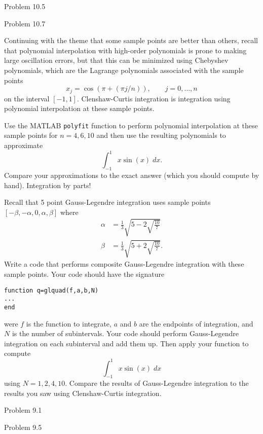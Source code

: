 \documentclass[minion]{homework}
\begin{document}
\begin{aproblems}
\vskip 0.5cm

\aproblem Problem 10.5

\aproblem Problem 10.7

\aproblem Continuing with the theme that some sample points are better than others, recall that polynomial interpolation with high-order polynomials is prone to making large oscillation errors, but that this can be minimized
using Chebyshev polynomials, which are the Lagrange polynomials associated
with the sample points 
\[
x_j= \cos(\pi+(\pi j/n)),\qquad j=0,\ldots,n
\]
on the interval $[-1,1]$.
Clenshaw-Curtis integration is integration using polynomial interpolation at
these sample points.

Use the MATLAB \texttt{polyfit} function to perform polynomial
interpolation at these sample points for $n=4,6,10$ and then
use the resulting polynomials to approximate
\[
\int_{-1}^1 x\sin(x)\;dx.
\]
Compare your approximations to the exact answer (which you should
compute by hand).  Integration by parts!

\aproblem Recall that 5 point Gauss-Legendre integration
uses sample points
$[-\beta,-\alpha,0,\alpha,\beta]$ where
\[
\begin{aligned}
\alpha &= \frac{1}{3}\sqrt{5-2\sqrt{\frac{10}{7}}}\\
\beta &= \frac{1}{3}\sqrt{5+2\sqrt{\frac{10}{7}}}.
\end{aligned}
\]
Write a code that performs composite Gauss-Legendre integration
with these sample points.  Your code should have the signature
\begin{verbatim}
function q=glquad(f,a,b,N)
...
end
\end{verbatim}
were $f$ is the function to integrate, $a$ and $b$ are the endpoints
of integration, and $N$ is the number of subintervals. Your code
should perform Gauss-Legendre integration on each subinterval and add them up.
Then apply your function to compute
\[
\int_{-1}^1 x\sin(x)\;dx
\]
using $N=1,2,4,10$.  Compare the results of Gauss-Legendre integration
to the results you saw using Clenshaw-Curtis integration.

\aproblem Problem 9.1

\aproblem Problem 9.5

\end{aproblems}
\end{document}
